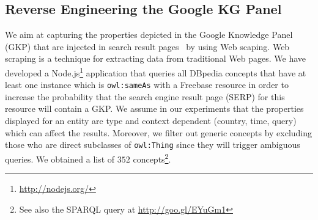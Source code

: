 
\subsection{Reverse Engineering the Google KG Panel}
\label{sec:knowledge-graph}
We aim at capturing the properties depicted in the Google Knowledge Panel (GKP) that are injected in search result pages~\cite{Bergman2012} by using Web scaping. Web scraping is a technique for extracting data from traditional Web pages. We have developed a Node.js\footnote{\url{http://nodejs.org/}} application that queries all DBpedia concepts that have at least one instance which is \texttt{owl:sameAs} with a Freebase resource in order to increase the probability that the search engine result page (SERP) for this resource will contain a GKP. We assume in our experiments that the properties displayed for an entity are type and context dependent (country, time, query) which can affect the results. Moreover, we filter out generic concepts by excluding those who are direct subclasses of \texttt{owl:Thing} since they will trigger ambiguous queries. We obtained a list of $352$ concepts\footnote{See also the SPARQL query at \url{http://goo.gl/EYuGm1}}.

